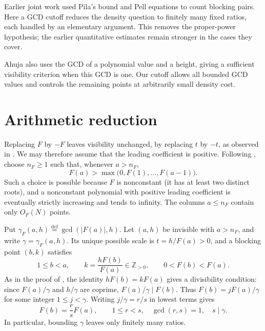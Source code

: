 \documentclass[10pt]{amsart}
\theoremstyle{remark}
\newcommand{\Z}{\mathbb{Z}}
\newcommand{\defeq}{\stackrel{\mathrm{def}}{=}}
\begin{document}
Earlier joint work used Pila's bound \cite{LP,Pila} and Pell equations
\cite[\S\S3--4]{LPQ} to count blocking pairs. Here a GCD cutoff reduces
the density question to finitely many fixed ratios, each handled by an
elementary argument. This removes the proper-power hypothesis; the earlier
quantitative estimates remain stronger in the cases they cover.

Ahuja \cite[Definition~3.1 and Lemma~3.2]{Ahuja} also uses the GCD of a
polynomial value and a height, giving a sufficient visibility criterion
when this GCD is one. Our cutoff allows all bounded GCD values and
controls the remaining points at arbitrarily small density cost.

\section{Arithmetic reduction}\label{sec:reduction}

Replacing $F$ by $-F$ leaves visibility unchanged, by replacing $t$ by
$-t$, as observed in \cite[\S1]{LP}. We may therefore assume that the
leading coefficient is positive. Following \cite[\S2]{LP}, choose
$n_F\geq1$ such that, whenever $a>n_F$,
\begin{equation}\label{eq:record}
             F(a)>\max\bigl(0,F(1),\ldots,F(a-1)\bigr).
\end{equation}
Such a choice is possible because $F$ is nonconstant (it has at least two
distinct roots), and a nonconstant polynomial with positive leading
coefficient is eventually strictly increasing and tends to infinity. The columns $a\leq n_F$ contain only $O_F(N)$ points.

Put $\gamma_F(a,h)\defeq\gcd(|F(a)|,h)$. Let $(a,h)$ be invisible
with $a>n_F$, and write $\gamma=\gamma_F(a,h)$. Its unique possible scale is
$t=h/F(a)>0$, and a blocking point $(b,k)$ satisfies
\[
 1\leq b<a,\qquad k=\frac{hF(b)}{F(a)}\in\Z_{>0},\qquad
 0<F(b)<F(a).
\]
As in the proof of \cite[Lemma~2.3]{LP}, the identity $hF(b)=kF(a)$ gives a
divisibility condition: since $F(a)/\gamma$ and $h/\gamma$ are coprime,
$F(a)/\gamma\mid F(b)$.
Thus $F(b)=jF(a)/\gamma$ for some integer $1\leq j<\gamma$.
Writing $j/\gamma=r/s$ in lowest terms gives
\begin{equation}\label{eq:finite-ratio}
       F(b)=\frac{r}{s}F(a),\qquad
       1\leq r<s,\quad\gcd(r,s)=1,\quad s\mid\gamma.
\end{equation}
In particular, bounding $\gamma$ leaves only finitely many ratios.
\end{document}
